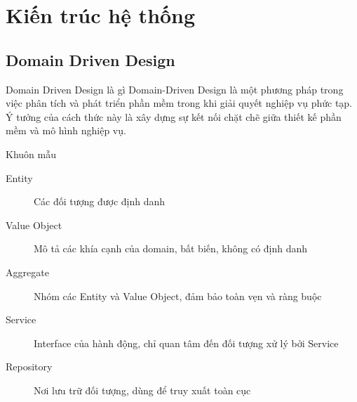 \section{Kiến trúc hệ thống}

\subsection{Domain Driven Design}

\begin{frame}{Domain Driven Design là gì}
	\alert{Domain-Driven Design} là một phương pháp trong việc phân tích và phát triển phần mềm trong khi giải quyết nghiệp vụ phức tạp. Ý tưởng của cách thức này là xây dựng sự kết nối chặt chẽ giữa thiết kế phần mềm và mô hình nghiệp vụ.
\end{frame}



\begin{frame}{Khuôn mẫu}
	\begin{description}
		\item[Entity] Các đối tượng được định danh
		\item[Value Object] Mô tả các khía cạnh của domain, bất biến, không có định danh
		\item[Aggregate] Nhóm các Entity và Value Object, đảm bảo toàn vẹn và ràng buộc
		\item[Service] Interface của hành động, chỉ quan tâm đến đối tượng xử lý bởi Service
		\item[Repository] Nơi lưu trữ đối tượng, dùng để truy xuất toàn cục
	\end{description}
\end{frame}

